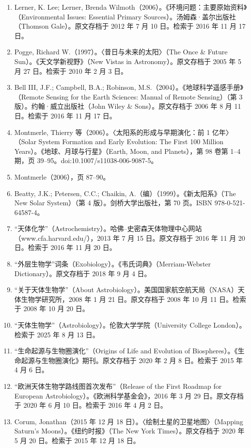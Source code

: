\begin{enumerate}
  \item Lerner, K. Lee; Lerner, Brenda Wilmoth（2006）。《环境问题：主要原始资料》（Environmental Issues: Essential Primary Sources）。汤姆森·盖尔出版社（Thomson Gale）。原文存档于 2012 年 7 月 10 日。检索于 2016 年 11 月 17 日。
  \item Pogge, Richard W.（1997）。〈昔日与未来的太阳〉（The Once \& Future Sun）。《天文学新视野》（New Vistas in Astronomy）。原文存档于 2005 年 5 月 27 日。检索于 2010 年 2 月 3 日。
  \item Bell III, J.F.; Campbell, B.A.; Robinson, M.S.（2004）。《地球科学遥感手册》（Remote Sensing for the Earth Sciences: Manual of Remote Sensing）（第 3 版）。约翰·威立出版社（John Wiley \& Sons）。原文存档于 2006 年 8 月 11 日。检索于 2016 年 11 月 17 日。
  \item Montmerle, Thierry 等（2006）。〈太阳系的形成与早期演化：前 1 亿年〉（Solar System Formation and Early Evolution: The First 100 Million Years）。《地球、月球与行星》（Earth, Moon, and Planets），第 98 卷第 1–4 期，页 39–95。doi:10.1007/s11038-006-9087-5。
  \item Montmerle（2006），页 87–90。
  \item Beatty, J.K.; Petersen, C.C.; Chaikin, A.（编）（1999）。《新太阳系》（The New Solar System）（第 4 版）。剑桥大学出版社，第 70 页。ISBN 978-0-521-64587-4。
  \item “天体化学”（Astrochemistry）。哈佛–史密森天体物理中心网站（www.cfa.harvard.edu/），2013 年 7 月 15 日。原文存档于 2016 年 11 月 20 日。检索于 2016 年 11 月 20 日。
  \item “外层生物学”词条（Exobiology）。《韦氏词典》（Merriam-Webster Dictionary）。原文存档于 2018 年 9 月 4 日。
  \item “关于天体生物学”（About Astrobiology）。美国国家航空航天局（NASA）天体生物学研究所，2008 年 1 月 21 日。原文存档于 2008 年 10 月 11 日。检索于 2008 年 10 月 20 日。
  \item “天体生物学”（Astrobiology）。伦敦大学学院（University College London）。检索于 2025 年 8 月 13 日。
  \item “生命起源与生物圈演化”（Origins of Life and Evolution of Biospheres）。《生命起源与生物圈演化》期刊。原文存档于 2020 年 2 月 8 日。检索于 2015 年 4 月 6 日。
  \item “欧洲天体生物学路线图首次发布”（Release of the First Roadmap for European Astrobiology）。《欧洲科学基金会》，2016 年 3 月 29 日。原文存档于 2020 年 6 月 10 日。检索于 2016 年 4 月 2 日。
  \item Corum, Jonathan（2015 年 12 月 18 日）。〈绘制土星的卫星地图〉（Mapping Saturn’s Moons）。《纽约时报》（The New York Times）。原文存档于 2020 年 5 月 20 日。检索于 2015 年 12 月 18 日。

\end{enumerate}
